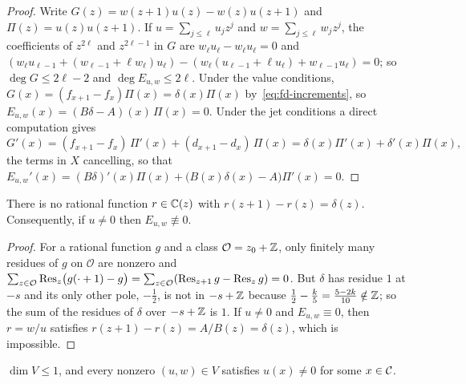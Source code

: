 \begin{proof}
Write $G(z)=w(z+1)u(z)-w(z)u(z+1)$ and $\Pi(z)=u(z)u(z+1)$. If
$u=\sum_{j\le\ell}u_jz^j$ and $w=\sum_{j\le\ell}w_jz^j$, the coefficients of $z^{2\ell}$ and
$z^{2\ell-1}$ in $G$ are $w_\ell u_\ell-w_\ell u_\ell=0$ and
$(w_\ell u_{\ell-1}+(w_{\ell-1}+\ell w_\ell)u_\ell)-(w_\ell(u_{\ell-1}+\ell u_\ell)+w_{\ell-1}u_\ell)=0$;
so $\deg G\le2\ell-2$ and $\deg E_{u,w}\le2\ell$. Under the value conditions,
$G(x)=(f_{x+1}-f_x)\Pi(x)=\delta(x)\Pi(x)$ by~\eqref{eq:fd-increments}, so
$E_{u,w}(x)=(B\delta-A)(x)\,\Pi(x)=0$. Under the jet conditions a direct computation gives
\[
  G'(x)=(f_{x+1}-f_x)\,\Pi'(x)+(d_{x+1}-d_x)\,\Pi(x)=\delta(x)\Pi'(x)+\delta'(x)\Pi(x),
\]
the terms in $X$ cancelling, so that
$E_{u,w}'(x)=(B\delta)'(x)\Pi(x)+\bigl(B(x)\delta(x)-A\bigr)\Pi'(x)=0$.
\end{proof}

\begin{lemma}\label{lem:no-rational-solution}
There is no rational function $r\in\mathbb{C}(z)$ with $r(z+1)-r(z)=\delta(z)$. Consequently, if
$u\ne0$ then $E_{u,w}\not\equiv0$.
\end{lemma}

\begin{proof}
For a rational function $g$ and a class $\mathcal O=z_0+\mathbb{Z}$, only finitely many residues of $g$
on $\mathcal O$ are nonzero and $\sum_{z\in\mathcal O}\operatorname{Res}_z\bigl(g(\cdot+1)-g\bigr)
=\sum_{z\in\mathcal O}(\operatorname{Res}_{z+1}g-\operatorname{Res}_zg)=0$. But $\delta$ has residue $1$ at $-s$ and its only
other pole, $-\frac12$, is not in $-s+\mathbb{Z}$ because $\frac12-\frac k5=\frac{5-2k}{10}\notin\mathbb{Z}$; so
the sum of the residues of $\delta$ over $-s+\mathbb{Z}$ is $1$. If $u\ne0$ and $E_{u,w}\equiv0$, then
$r=w/u$ satisfies $r(z+1)-r(z)=A/B(z)=\delta(z)$, which is impossible.
\end{proof}

\begin{lemma}\label{lem:corank}
$\dim V\le1$, and every nonzero $(u,w)\in V$ satisfies $u(x)\ne0$ for some $x\in\mathcal{C}$.
\end{lemma}


